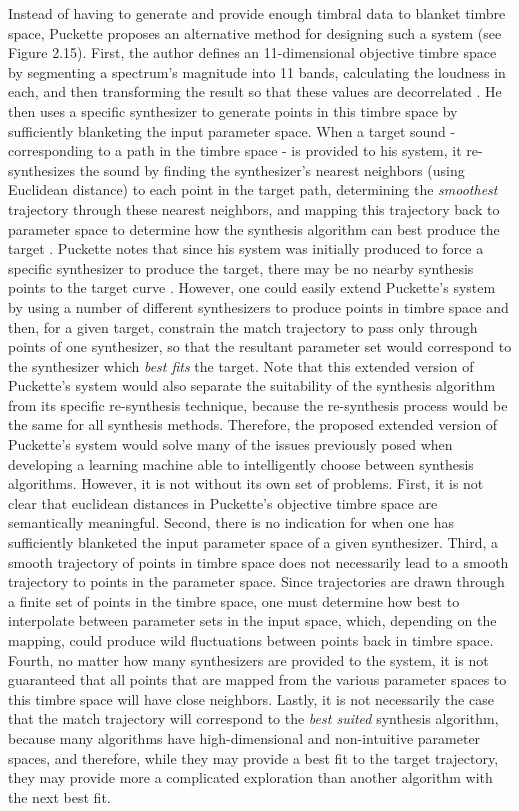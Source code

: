 \documentclass[a4paper,12pt]{report} 	%
\numberwithin{figure}{chapter}
\numberwithin{table}{chapter}
\numberwithin{equation}{chapter}
\begin{document}
\begin{flushleft}
Instead of having to generate and provide enough timbral data to blanket timbre space, Puckette \cite{Puckette:2004zp} proposes an alternative method for designing such a system (see Figure 2.15). First, the author defines an 11-dimensional objective timbre space by segmenting a spectrum's magnitude into 11 bands, calculating the loudness in each, and then transforming the result so that these values are decorrelated \cite[p. 1-2]{Puckette:2004zp}. He then uses a specific synthesizer to generate points in this timbre space by sufficiently blanketing the input parameter space. When a target sound - corresponding to a path in the timbre space - is provided to his system, it re-synthesizes the sound by finding the synthesizer's nearest neighbors (using Euclidean distance) to each point in the target path, determining the \emph{smoothest} trajectory through these nearest neighbors, and mapping this trajectory back to parameter space to determine how the synthesis algorithm can best produce the target \cite[p. 3]{Puckette:2004zp}. Puckette notes that since his system was initially produced to force a specific synthesizer to produce the target, there may be no nearby synthesis points to the target curve \cite[p. 3]{Puckette:2004zp}. However, one could easily extend Puckette's system by using a number of different synthesizers to produce points in timbre space and then, for a given target, constrain the match trajectory to pass only through points of one synthesizer, so that the resultant parameter set would correspond to the synthesizer which \emph{best fits} the target. Note that this extended version of Puckette's system would also separate the suitability of the synthesis algorithm from its specific re-synthesis technique, because the re-synthesis process would be the same for all synthesis methods. Therefore, the proposed extended version of Puckette's system would solve many of the issues previously posed when developing a learning machine able to intelligently choose between synthesis algorithms. However, it is not without its own set of problems. First, it is not clear that euclidean distances in Puckette's objective timbre space are semantically meaningful. Second, there is no indication for when one has sufficiently blanketed the input parameter space of a given synthesizer. Third, a smooth trajectory of points in timbre space does not necessarily lead to a smooth trajectory to points in the parameter space. Since trajectories are drawn through a finite set of points in the timbre space, one must determine how best to interpolate between parameter sets in the input space, which, depending on the mapping, could produce wild fluctuations between points back in timbre space. Fourth, no matter how many synthesizers are provided to the system, it is not guaranteed that all points that are mapped from the various parameter spaces to this timbre space will have close neighbors. Lastly, it is not necessarily the case that the match trajectory will correspond to the \emph{best suited} synthesis algorithm, because many algorithms have high-dimensional and non-intuitive parameter spaces, and therefore, while they may provide a best fit to the target trajectory, they may provide more a complicated exploration than another algorithm with the next best fit.

\end{flushleft}
\end{document}
